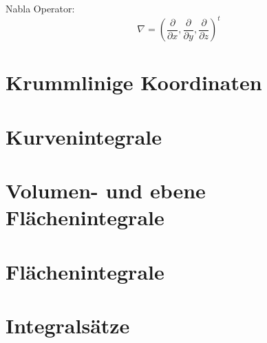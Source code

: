 \begin{framedprop}
Nabla Operator:
\[
\nabla = \left( \frac{\partial}{\partial x}, \frac{\partial}{\partial y}, \frac{\partial}{\partial z} \right)^t
\]
\end{framedprop}

\section{Krummlinige Koordinaten}

\section{Kurvenintegrale}

\section{Volumen- und ebene Flächenintegrale}

\section{Flächenintegrale}

\section{Integralsätze}